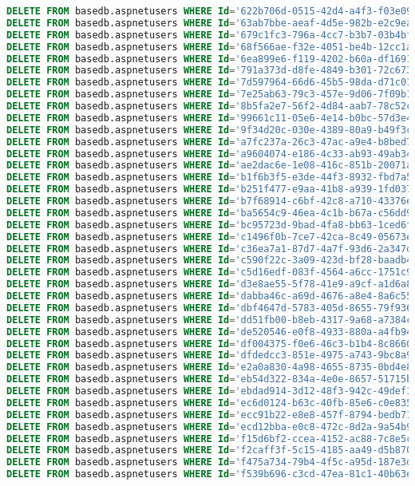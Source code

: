 \documentclass[12pt]{article}
\begin{document}
\begin{lstlisting}[language=SQL]
DELETE FROM basedb.aspnetusers WHERE Id='622b706d-0515-42d4-a4f3-f03e0990daca';
DELETE FROM basedb.aspnetusers WHERE Id='63ab7bbe-aeaf-4d5e-982b-e2c9ea73938d';
DELETE FROM basedb.aspnetusers WHERE Id='679c1fc3-796a-4cc7-b3b7-03b4bf0e9d13';
DELETE FROM basedb.aspnetusers WHERE Id='68f566ae-f32e-4051-be4b-12cc1a23ec01';
DELETE FROM basedb.aspnetusers WHERE Id='6ea899e6-f119-4202-b60a-df1691472fa4';
DELETE FROM basedb.aspnetusers WHERE Id='791a373d-d8fe-4849-b301-72c67383ed58';
DELETE FROM basedb.aspnetusers WHERE Id='7d597964-66d6-45b5-98da-d71c01b12f67';
DELETE FROM basedb.aspnetusers WHERE Id='7e25ab63-79c3-457e-9d06-7f09b164f132';
DELETE FROM basedb.aspnetusers WHERE Id='8b5fa2e7-56f2-4d84-aab7-78c52ca4c1db';
DELETE FROM basedb.aspnetusers WHERE Id='99661c11-05e6-4e14-b0bc-57d3e458ebcb';
DELETE FROM basedb.aspnetusers WHERE Id='9f34d20c-030e-4389-80a9-b49f3c43143b';
DELETE FROM basedb.aspnetusers WHERE Id='a7fc237a-26c3-47ac-a9e4-b8bed7fd3824';
DELETE FROM basedb.aspnetusers WHERE Id='a9604074-e186-4c33-ab93-49ab34e39ce1';
DELETE FROM basedb.aspnetusers WHERE Id='ae2dac6e-1e08-416c-851b-20071a792672';
DELETE FROM basedb.aspnetusers WHERE Id='b1f6b3f5-e3de-44f3-8932-fbd7a53f6b3c';
DELETE FROM basedb.aspnetusers WHERE Id='b251f477-e9aa-41b8-a939-1fd0374dc310';
DELETE FROM basedb.aspnetusers WHERE Id='b7f68914-c6bf-42c8-a710-43376e8a8586';
DELETE FROM basedb.aspnetusers WHERE Id='ba5654c9-46ea-4c1b-b67a-c56dd9bcca5c';
DELETE FROM basedb.aspnetusers WHERE Id='bc95723d-9bad-4fa8-bb63-1ced6ffc5c80';
DELETE FROM basedb.aspnetusers WHERE Id='c1496f0b-7ce7-42ca-8c49-05673eceee83';
DELETE FROM basedb.aspnetusers WHERE Id='c36ea7a1-87d7-4a7f-93d6-2a347de37b5d';
DELETE FROM basedb.aspnetusers WHERE Id='c590f22c-3a09-423d-bf28-baadb449a369';
DELETE FROM basedb.aspnetusers WHERE Id='c5d16edf-083f-4564-a6cc-1751c98ecc3b';
DELETE FROM basedb.aspnetusers WHERE Id='d3e8ae55-5f78-41e9-a9cf-a1d6a8c2ec59';
DELETE FROM basedb.aspnetusers WHERE Id='dabba46c-a69d-4676-a8e4-8a6c5598ab76';
DELETE FROM basedb.aspnetusers WHERE Id='dbf4647d-5783-405d-8655-79f9369c4c8e';
DELETE FROM basedb.aspnetusers WHERE Id='dd51fb00-b8eb-4317-9a68-a7384caa3d3b';
DELETE FROM basedb.aspnetusers WHERE Id='de520546-e0f8-4933-880a-a4fb947a3684';
DELETE FROM basedb.aspnetusers WHERE Id='df004375-f0e6-46c3-b1b4-8c8660705c75';
DELETE FROM basedb.aspnetusers WHERE Id='dfdedcc3-851e-4975-a743-9bc8a91078ef';
DELETE FROM basedb.aspnetusers WHERE Id='e2a0a830-4a98-4655-8735-0bd4e8264622';
DELETE FROM basedb.aspnetusers WHERE Id='eb54d322-834a-4e0e-8657-51715bd41ecb';
DELETE FROM basedb.aspnetusers WHERE Id='ebdad914-3d12-48f3-942c-49def121dcd7';
DELETE FROM basedb.aspnetusers WHERE Id='ec6d0124-b63c-40fb-85e6-c0e83518ac4e';
DELETE FROM basedb.aspnetusers WHERE Id='ecc91b22-e8e8-457f-8794-bedb713b5d01';
DELETE FROM basedb.aspnetusers WHERE Id='ecd12bba-e0c8-472c-8d2a-9a54b9a40873';
DELETE FROM basedb.aspnetusers WHERE Id='f15d6bf2-ccea-4152-ac88-7c8e5c191f1f';
DELETE FROM basedb.aspnetusers WHERE Id='f2caff3f-5c15-4185-aa49-d5b870b17b80';
DELETE FROM basedb.aspnetusers WHERE Id='f475a734-79b4-4f5c-a95d-187e3d4cb3e9';
DELETE FROM basedb.aspnetusers WHERE Id='f539b696-c3cd-47ea-81c1-40b63e6f7435';
\end{lstlisting}
\end{document}
